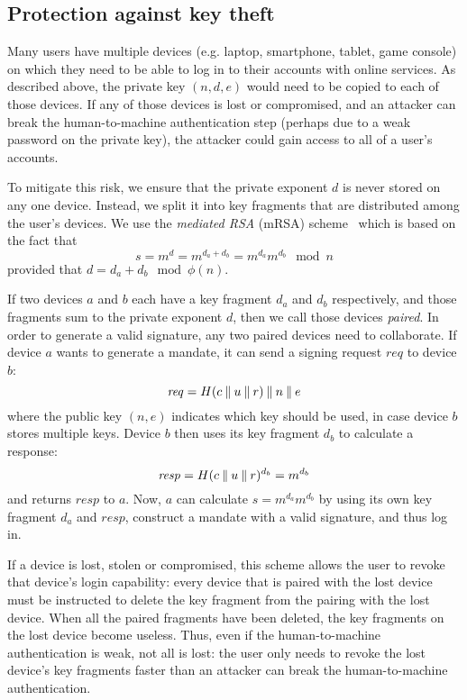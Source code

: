\subsection{Protection against key theft}\label{sec:revocation}

Many users have multiple devices (e.g. laptop, smartphone, tablet, game console) on which they need
to be able to log in to their accounts with online services. As described above, the private key
$(n, d, e)$ would need to be copied to each of those devices. If any of those devices is lost or
compromised, and an attacker can break the human-to-machine authentication step (perhaps due to a
weak password on the private key), the attacker could gain access to all of a user's accounts.

To mitigate this risk, we ensure that the private exponent $d$ is never stored on any one device.
Instead, we split it into key fragments that are distributed among the user's devices. We use the
\emph{mediated RSA} (mRSA) scheme~\cite{Boneh01, Kutyiowski12} which is based on the fact that
$$s = m^d = m^{d_a + d_b} = m^{d_a} m^{d_b} \mod n$$ provided that $d = d_a + d_b \mod \phi(n)$.

If two devices $a$ and $b$ each have a key fragment $d_a$ and $d_b$ respectively, and those
fragments sum to the private exponent $d$, then we call those devices \emph{paired}. In order to
generate a valid signature, any two paired devices need to collaborate. If device $a$ wants to
generate a mandate, it can send a signing request $\mathit{req}$ to device $b$:
$$\mathit{req} = H(c \mathbin{\|} u \mathbin{\|} r) \mathbin{\|} n \mathbin{\|} e$$
where the public key $(n, e)$ indicates which key should be used, in case device $b$ stores multiple
keys. Device $b$ then uses its key fragment $d_b$ to calculate a response:
$$\mathit{resp} = H(c \mathbin{\|} u \mathbin{\|} r)^{d_b} = m^{d_b}$$
and returns $\mathit{resp}$ to $a$. Now, $a$ can calculate $s = m^{d_a} m^{d_b}$ by using its own
key fragment $d_a$ and $\mathit{resp}$, construct a mandate with a valid signature, and thus log in.

If a device is lost, stolen or compromised, this scheme allows the user to revoke that device's
login capability: every device that is paired with the lost device must be instructed to delete the
key fragment from the pairing with the lost device. When all the paired fragments have been deleted,
the key fragments on the lost device become useless. Thus, even if the human-to-machine
authentication is weak, not all is lost: the user only needs to revoke the lost device's key
fragments faster than an attacker can break the human-to-machine authentication.

